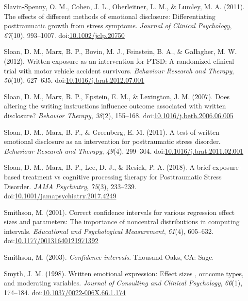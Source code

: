 \documentclass[,man]{apa6}
\begin{document}
\leavevmode\hypertarget{ref-Slavin-Spenny2011}{}%
Slavin-Spenny, O. M., Cohen, J. L., Oberleitner, L. M., \& Lumley, M. A. (2011). The effects of different methods of emotional disclosure: Differentiating posttraumatic growth from stress symptoms. \emph{Journal of Clinical Psychology}, \emph{67}(10), 993--1007. doi:\href{https://doi.org/10.1002/jclp.20750}{10.1002/jclp.20750}

\leavevmode\hypertarget{ref-Sloan2012}{}%
Sloan, D. M., Marx, B. P., Bovin, M. J., Feinstein, B. A., \& Gallagher, M. W. (2012). Written exposure as an intervention for PTSD: A randomized clinical trial with motor vehicle accident survivors. \emph{Behaviour Research and Therapy}, \emph{50}(10), 627--635. doi:\href{https://doi.org/10.1016/j.brat.2012.07.001}{10.1016/j.brat.2012.07.001}

\leavevmode\hypertarget{ref-Sloan2007}{}%
Sloan, D. M., Marx, B. P., Epstein, E. M., \& Lexington, J. M. (2007). Does altering the writing instructions influence outcome associated with written disclosure? \emph{Behavior Therapy}, \emph{38}(2), 155--168. doi:\href{https://doi.org/10.1016/j.beth.2006.06.005}{10.1016/j.beth.2006.06.005}

\leavevmode\hypertarget{ref-Sloan2011a}{}%
Sloan, D. M., Marx, B. P., \& Greenberg, E. M. (2011). A test of written emotional disclosure as an intervention for posttraumatic stress disorder. \emph{Behaviour Research and Therapy}, \emph{49}(4), 299--304. doi:\href{https://doi.org/10.1016/j.brat.2011.02.001}{10.1016/j.brat.2011.02.001}

\leavevmode\hypertarget{ref-Sloan2018}{}%
Sloan, D. M., Marx, B. P., Lee, D. J., \& Resick, P. A. (2018). A brief exposure-based treatment vs cognitive processing therapy for Posttraumatic Stress Disorder. \emph{JAMA Psychiatry}, \emph{75}(3), 233--239. doi:\href{https://doi.org/10.1001/jamapsychiatry.2017.4249}{10.1001/jamapsychiatry.2017.4249}

\leavevmode\hypertarget{ref-Smithson2001}{}%
Smithson, M. (2001). Correct confidence intervals for various regression effect sizes and parameters: The importance of noncentral distributions in computing intervals. \emph{Educational and Psychological Measurement}, \emph{61}(4), 605--632. doi:\href{https://doi.org/10.1177/00131640121971392}{10.1177/00131640121971392}

\leavevmode\hypertarget{ref-Smithson2003}{}%
Smithson, M. (2003). \emph{Confidence intervals}. Thousand Oaks, CA: Sage.

\leavevmode\hypertarget{ref-Smyth1998}{}%
Smyth, J. M. (1998). Written emotional expression: Effect sizes , outcome types, and moderating variables. \emph{Journal of Consulting and Clinical Psychology}, \emph{66}(1), 174--184. doi:\href{https://doi.org/10.1037/0022-006X.66.1.174}{10.1037/0022-006X.66.1.174}
\end{document}

